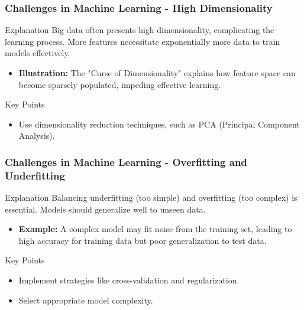 \documentclass[aspectratio=169]{beamer}
\begin{document}
\begin{frame}[fragile]
    \frametitle{Challenges in Machine Learning - High Dimensionality}
    \begin{block}{Explanation}
        Big data often presents high dimensionality, complicating the learning process.
        More features necessitate exponentially more data to train models effectively.
    \end{block}
    \begin{itemize}
        \item \textbf{Illustration:} The "Curse of Dimensionality" explains how feature space can become sparsely populated, impeding effective learning.
    \end{itemize}
    \begin{block}{Key Points}
        \begin{itemize}
            \item Use dimensionality reduction techniques, such as PCA (Principal Component Analysis).
        \end{itemize}
    \end{block}
\end{frame}

\begin{frame}[fragile]
    \frametitle{Challenges in Machine Learning - Overfitting and Underfitting}
    \begin{block}{Explanation}
        Balancing underfitting (too simple) and overfitting (too complex) is essential. 
        Models should generalize well to unseen data.
    \end{block}
    \begin{itemize}
        \item \textbf{Example:} A complex model may fit noise from the training set, leading to high accuracy for training data but poor generalization to test data.
    \end{itemize}
    \begin{block}{Key Points}
        \begin{itemize}
            \item Implement strategies like cross-validation and regularization.
            \item Select appropriate model complexity.
        \end{itemize}
    \end{block}
\end{frame}
\end{document}
